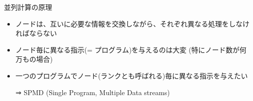 \begin{frame}[t,fragile]{並列計算の原理}
  \begin{itemize}
  \item ノードは、互いに必要な情報を交換しながら、それぞれ異なる処理をしなければならない
  \item ノード毎に異なる指示(= プログラム)を与えるのは大変 (特にノード数が何万もの場合)
  \item 一つのプログラムでノード(ランクとも呼ばれる)毎に異なる指示を与えたい

    ⇒ SPMD (Single Program, Multiple Data streams)

  \end{itemize}
\end{frame}

